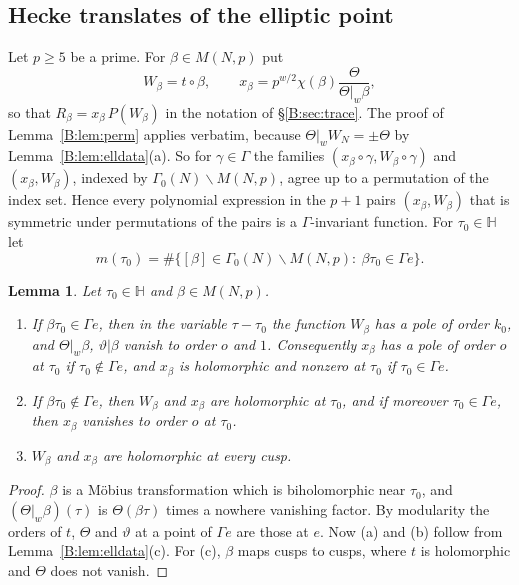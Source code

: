 \documentclass[11pt,a4paper]{article}
\newtheorem{lemma}[theorem]{Lemma}
\theoremstyle{definition}\newtheorem{definition}[theorem]{Definition}
\theoremstyle{remark}\newtheorem{remark}[theorem]{Remark}
\newcommand{\Hb}{\mathbb H}
\numberwithin{equation}{section}
\begin{document}
\subsection{Hecke translates of the elliptic point}
Let $p\ge5$ be a prime. For $\beta\in M(N,p)$ put
\[
W_\beta=t\circ\beta,\qquad x_\beta=p^{w/2}\chi(\beta)\frac{\Theta}{\Theta|_w\beta},
\]
so that $R_\beta=x_\beta\,P(W_\beta)$ in the notation of \S\ref{B:sec:trace}. The proof of Lemma~\ref{B:lem:perm} applies
verbatim, because $\Theta|_wW_N=\pm\Theta$ by Lemma~\ref{B:lem:elldata}(a). So for $\gamma\in\Gamma$ the families
$(x_\beta\circ\gamma,W_\beta\circ\gamma)$ and $(x_\beta,W_\beta)$, indexed by $\Gamma_0(N)\backslash M(N,p)$, agree up
to a permutation of the index set. Hence every polynomial expression in the $p+1$ pairs $(x_\beta,W_\beta)$ that is symmetric
under permutations of the pairs is a $\Gamma$-invariant function. For $\tau_0\in\Hb$ let
\[
m(\tau_0)=\#\{[\beta]\in\Gamma_0(N)\backslash M(N,p):\ \beta\tau_0\in\Gamma e\}.
\]

\begin{lemma}\label{B:lem:loc}
Let $\tau_0\in\Hb$ and $\beta\in M(N,p)$.
\begin{enumerate}[label=\textup{(\alph*)}]
\item If $\beta\tau_0\in\Gamma e$, then in the variable $\tau-\tau_0$ the function $W_\beta$ has a pole of order $k_0$, and
$\Theta|_w\beta$, $\vartheta|\beta$ vanish to order $o$ and $1$. Consequently $x_\beta$ has a pole of order $o$ at $\tau_0$
if $\tau_0\notin\Gamma e$, and $x_\beta$ is holomorphic and nonzero at $\tau_0$ if $\tau_0\in\Gamma e$.
\item If $\beta\tau_0\notin\Gamma e$, then $W_\beta$ and $x_\beta$ are holomorphic at $\tau_0$, and if moreover
$\tau_0\in\Gamma e$, then $x_\beta$ vanishes to order $o$ at $\tau_0$.
\item $W_\beta$ and $x_\beta$ are holomorphic at every cusp.
\end{enumerate}
\end{lemma}

\begin{proof}
$\beta$ is a M\"obius transformation which is biholomorphic near $\tau_0$, and $(\Theta|_w\beta)(\tau)$ is
$\Theta(\beta\tau)$ times a nowhere vanishing factor. By modularity the orders of $t$, $\Theta$ and $\vartheta$ at a
point of $\Gamma e$ are those at $e$. Now (a) and (b) follow from Lemma~\ref{B:lem:elldata}(c). For (c), $\beta$ maps cusps
to cusps, where $t$ is holomorphic and $\Theta$ does not vanish.
\end{proof}
\end{document}
